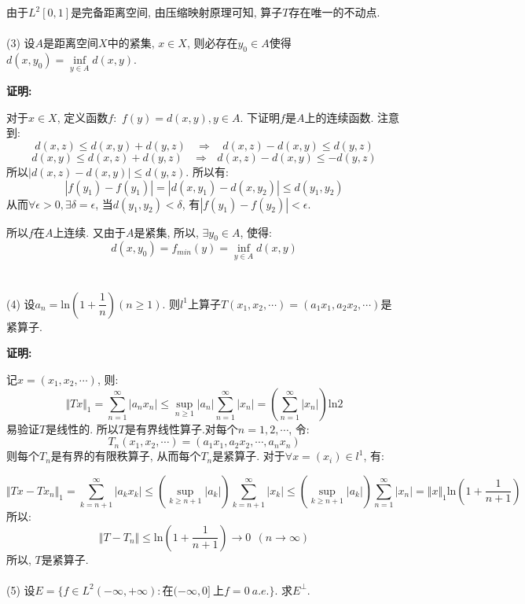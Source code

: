 \documentclass{article}
\begin{document}
由于$L^2[0,1]$是完备距离空间, 由压缩映射原理可知, 算子$T$存在唯一的不动点. \\  \\


(3) 设$A$是距离空间$X$中的紧集, $x \in X$, 则必存在$y_0 \in A$使得$d(x, y_0) = \inf\limits_{y \in A} d(x,y)$. 

\textbf{证明:}

对于$x \in X$, 定义函数$f:$ $f(y) = d(x, y), y \in A$. 下证明$f$是$A$上的连续函数.
注意到:
$$ d(x,z) \leq d(x,y) + d(y,z)  \ \ \ \ \Rightarrow \ \ \ \ d(x,z) - d(x,y) \leq d(y,z) $$
$$ d(x,y) \leq d(x,z) + d(y,z)  \ \ \ \ \Rightarrow \ \ \  d(x,z) - d(x,y) \leq -d(y,z)$$
所以$|d(x,z) - d(x,y)| \leq d(y,z)$. 所以有:
$$ |f(y_1) - f(y_1)| = |d(x,y_1) - d(x,y_2)| \leq d(y_1, y_2) $$
从而$\forall \epsilon >0, \exists \delta = \epsilon$, 当$d(y_1, y_2) < \delta$, 有$|f(y_1) - f(y_2)| < \epsilon$. 

所以$f$在$A$上连续. 又由于$A$是紧集, 所以, $\exists y_0 \in A$, 使得:
$$ d(x, y_0) = f_{min}(y) = \inf\limits_{y \in A} d(x,y) $$  \\  \\ 



(4) 设$a_n = \text{ln}(1+\dfrac{1}{n})(n \geq 1)$. 则$l^1$上算子$T(x_1, x_2, \cdots) = (a_1x_1, a_2x_2, \cdots)$是紧算子. 

\textbf{证明:} 

记$x = (x_1, x_2, \cdots)$, 则:
$$\Vert Tx \Vert_1 = \sum\limits_{n=1}^{\infty} |a_nx_n| \leq \sup\limits_{n \geq 1} |a_n| \sum\limits_{n=1}^{\infty} |x_n| = (\sum\limits_{n=1}^{\infty} |x_n|)\text{ln}2 $$
易验证$T$是线性的. 所以$T$是有界线性算子.对每个$n=1,2,\cdots$, 令:
$$ T_n(x_1, x_2, \cdots) = (a_1x_1, a_2x_2, \cdots, a_nx_n) $$
则每个$T_n$是有界的有限秩算子, 从而每个$T_n$是紧算子. 对于$\forall x=(x_i) \in l^1$, 有:

$$ \Vert Tx - Tx_n \Vert_1 = \sum\limits_{k=n+1}^{\infty} |a_kx_k| \leq (\sup\limits_{k \geq n+1} |a_k|) \sum\limits_{k=n+1}^{\infty} |x_k| \leq (\sup\limits_{k \geq n+1} |a_k|) \sum\limits_{n=1}^{\infty} |x_n| = \Vert x \Vert_1 \text{ln}(1+\frac{1}{n+1}) $$
所以:
$$ \Vert T - T_n \Vert \leq \text{ln}(1+\frac{1}{n+1}) \rightarrow 0 \ \ (n \rightarrow \infty) $$
所以, $T$是紧算子. \\  \\ 


(5) 设$E = \{ f \in L^2(-\infty, +\infty): \text{在}(-\infty, 0] \ \text{上} f=0 \  a.e. \}$. 求$E^{\perp}$. 
\end{document}
